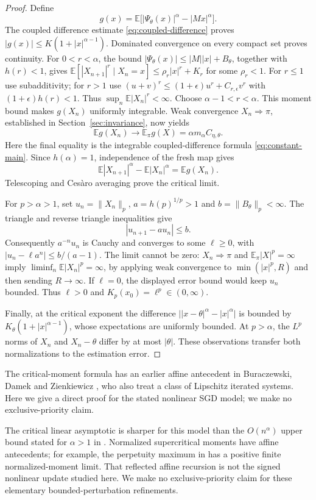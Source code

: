 \documentclass[11pt,a4paper]{article}
\numberwithin{equation}{section}
\theoremstyle{remark}
\newcommand{\E}{\mathbb E}
\begin{document}
\begin{proof}
Define
\[
 g(x)=\E\big[|\Psi_\theta(x)|^\alpha-|Mx|^\alpha\big].
\]
The coupled difference estimate \eqref{eq:coupled-difference} proves
$|g(x)|\le K(1+|x|^{\alpha-1})$. Dominated convergence on every compact
set proves continuity. For $0<r<\alpha$, the bound
$|\Psi_\theta(x)|\le |M||x|+B_\theta$, together with $h(r)<1$,
gives $\E[|X_{n+1}|^r\mid X_n=x]\le\rho_r|x|^r+K_r$ for some
$\rho_r<1$. For $r\le1$ use subadditivity; for $r>1$ use
$(u+v)^r\le(1+\epsilon)u^r+C_{r,\epsilon}v^r$ with
$(1+\epsilon)h(r)<1$. Thus $\sup_n\E|X_n|^r<\infty$.
Choose $\alpha-1<r<\alpha$. This moment bound makes $g(X_n)$
uniformly integrable. Weak convergence $X_n\Rightarrow\pi$, established
in Section~\ref{sec:invariance}, now yields
\[
 \E g(X_n)\longrightarrow\E_\pi g(X)
 =\alpha m_\alpha C_{\eta,\theta}.
\]
Here the final equality is the integrable coupled-difference formula
\eqref{eq:constant-main}. Since $h(\alpha)=1$, independence of the
fresh map gives
\[
 \E|X_{n+1}|^\alpha-\E|X_n|^\alpha=\E g(X_n).
\]
Telescoping and Ces\`aro averaging prove the critical limit.

For $p>\alpha>1$, set $u_n=\|X_n\|_p$,
$a=h(p)^{1/p}>1$ and $b=\|B_\theta\|_p<\infty$.
The triangle and reverse triangle inequalities give
\[
 |u_{n+1}-a u_n|\le b.
\]
Consequently $a^{-n}u_n$ is Cauchy and converges to some $\ell\ge0$,
with $|u_n-\ell a^n|\le b/(a-1)$. The limit cannot be zero:
$X_n\Rightarrow\pi$ and $\E_\pi|X|^p=\infty$ imply
$\liminf_n\E|X_n|^p=\infty$, by applying weak convergence to
$\min(|x|^p,R)$ and then sending $R\to\infty$.
If $\ell=0$, the displayed error bound would keep $u_n$ bounded.
Thus $\ell>0$ and $K_p(x_0)=\ell^p\in(0,\infty)$.

Finally, at the critical exponent the difference
$\big||x-\theta|^\alpha-|x|^\alpha\big|$
is bounded by $K_\theta(1+|x|^{\alpha-1})$, whose expectations are
uniformly bounded. At $p>\alpha$, the $L^p$ norms of $X_n$ and
$X_n-\theta$ differ by at most $|\theta|$. These observations transfer
both normalizations to the estimation error.
\end{proof}

The critical-moment formula has an earlier affine antecedent in
Buraczewski, Damek and Zienkiewicz \cite{BDZ2016}, who also treat a class
of Lipschitz iterated systems. Here we give a direct proof for the stated
nonlinear SGD model; we make no exclusive-priority claim.

The critical linear asymptotic is sharper for this model than the
$O(n^\alpha)$ upper bound stated for $\alpha>1$ in
\cite[Proposition 10]{Gurbuzbalaban2021}. Normalized supercritical
moments have affine antecedents; for example, the perpetuity maximum in
\cite[equation (3.33) and its proof]{BCDZ2016} has a positive finite
normalized-moment limit. That reflected affine recursion is not the
signed nonlinear update studied here. We make no exclusive-priority
claim for these elementary bounded-perturbation refinements.
\end{document}
